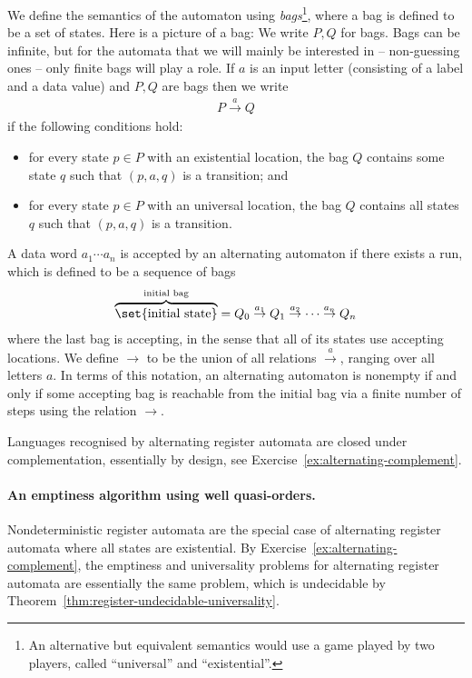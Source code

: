 We define the semantics of the automaton using \emph{bags}\footnote{An alternative but equivalent semantics would use a game played by two players, called ``universal'' and ``existential''.}, where a bag is defined to be a set of states. Here is a picture of a bag:
	We write $P,Q$ for bags. Bags can be infinite, but for the automata that we will mainly be interested in -- non-guessing ones -- only finite bags will play a role. If $a$ is an input letter (consisting of a label and a data value) and $P,Q$ are bags then we write
	\begin{align*}
		P \stackrel a \to Q	
	\end{align*}
	 if the following conditions hold: 
\begin{itemize} 
	\item for every state $p \in P$ with an existential location, the bag $Q$ contains some state $q$ such that $(p,a,q)$ is a transition; and
	\item for every state $p \in P$ with an universal location, the bag $Q$ contains all states $q$ such that $(p,a,q)$ is a transition. 
\end{itemize} 
A data word $a_1 \cdots a_n$ is accepted by an alternating automaton if there exists a run, which is defined to be a sequence of bags
\begin{align*}
\overbrace{\set{\text{initial state}}}^{\text{initial bag}}= Q_0 \stackrel {a_1} \to Q_1 \stackrel {a_2} \to \cdots \stackrel {a_{n}} \to Q_n 
\end{align*}
where the last bag is accepting, in the sense that all of its states use accepting locations. 
 We define $\to$ to be the union of all relations $\stackrel a \to$, ranging over all letters $a$. In terms of this notation, an alternating automaton is nonempty if and only if some accepting bag is reachable from the initial bag via a finite number of steps using the relation $\to$.

Languages recognised by alternating register automata are closed under complementation, essentially by design, see Exercise~\ref{ex:alternating-complement}.




\paragraph*{An emptiness algorithm using well quasi-orders.} Nondeterministic register automata are the special case of alternating register automata where all states are existential.
By Exercise~\ref{ex:alternating-complement}, the emptiness and universality problems for alternating register automata are essentially the same problem, which is undecidable by Theorem~\ref{thm:register-undecidable-universality}. 

